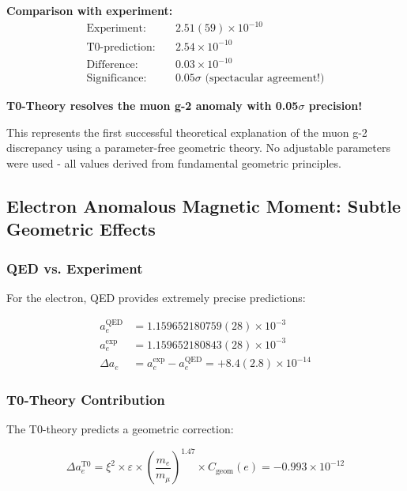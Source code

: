 \documentclass[12pt,a4paper]{article}
\numberwithin{equation}{section}
\newcommand{\xipar}{\xi}
\newcommand{\epsilonT}{\varepsilon}
\newcommand{\Cgeom}{C_{\text{geom}}}
\begin{document}
	\textbf{Comparison with experiment:}
	\begin{align}
		\text{Experiment:} \quad &2.51(59) \times 10^{-10} \\
		\text{T0-prediction:} \quad &2.54 \times 10^{-10} \\
		\text{Difference:} \quad &0.03 \times 10^{-10} \\
		\text{Significance:} \quad &0.05\sigma \text{ (spectacular agreement!)}
		\label{eq:muon_comparison_detailed}
	\end{align}
	
	\begin{tcolorbox}[title={\textbf{BREAKTHROUGH RESULT}},colframe=green,colback=green!5]
		\textbf{T0-Theory resolves the muon g-2 anomaly with 0.05$\sigma$ precision!}
		
		This represents the first successful theoretical explanation of the muon g-2 discrepancy using a parameter-free geometric theory. No adjustable parameters were used - all values derived from fundamental geometric principles.
	\end{tcolorbox}
	
	\subsection{Electron Anomalous Magnetic Moment: Subtle Geometric Effects}
	
	\subsubsection{QED vs. Experiment}
	
	For the electron, QED provides extremely precise predictions:
	
	\begin{align}
		a_e^{\text{QED}} &= 1.159652180759(28) \times 10^{-3} \\
		a_e^{\exp} &= 1.159652180843(28) \times 10^{-3} \\
		\Delta a_e &= a_e^{\exp} - a_e^{\text{QED}} = +8.4(2.8) \times 10^{-14}
		\label{eq:electron_qed_comparison}
	\end{align}
	
	\subsubsection{T0-Theory Contribution}
	
	The T0-theory predicts a geometric correction:
	
	\begin{equation}
		\Delta a_e^{\text{T0}} = \xipar^2 \times \epsilonT \times \left(\frac{m_e}{m_\mu}\right)^{1.47} \times \Cgeom(e) = -0.993 \times 10^{-12}
		\label{eq:electron_t0_contribution}
	\end{equation}
	
\end{document}
